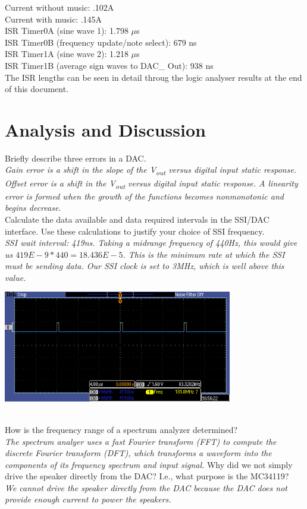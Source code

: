 \documentclass[twoside]{article}
\begin{document}
\noindent Current without music: .102A\\
Current with music: .145A\\

\noindent ISR Timer0A (sine wave 1): 1.798 $\mu$s\\
ISR Timer0B  (frequency update/note select): 679 ns\\
ISR Timer1A (sine wave 2): 1.218 $\mu$s\\
ISR Timer1B (average sign waves to DAC\_ Out): 938 ns \\
The ISR lengths can be seen in detail throug the logic analyser results at the end of this document.

\section*{Analysis and Discussion}


\begin{pset}
   Briefly describe three errors in a DAC. \\
  \emph{Gain error is a shift in the slope of the V\textsubscript{out} versus digital input static response. Offset error is a shift in the V\textsubscript{out} versus digital input static response. A linearity error is formed when the growth of the functions becomes nonmonotonic and begins decrease.\\}
   Calculate the data available and data required intervals in the SSI/DAC interface. Use these calculations to justify your choice of SSI frequency. \\ 
  \emph{SSI wait interval: 419ns. Taking a midrange frequency of 440Hz, this would give us $419E-9*440=18.436E-5$. This is the minimum rate at which the SSI must be sending data. Our SSI clock is set to 3MHz, which is well above this value.}\\
  \centerline{\includegraphics[width=0.75\textwidth]{SSI_waitPeriod}}\\
  \vskip 0.1in
   How is the frequency range of a spectrum analyzer determined? \\ 
  \emph{The spectrum analyer uses a fast Fourier transform (FFT) to compute the discrete Fourier transform (DFT), which transforms a waveform into the components of its frequency spectrum and input signal.}
   Why did we not simply drive the speaker directly from the DAC? I.e., what purpose is the MC34119? \\
  \emph{We cannot drive the speaker directly from the DAC because the DAC does not provide enough current to power the speakers.}

\end{pset}
\end{document}

